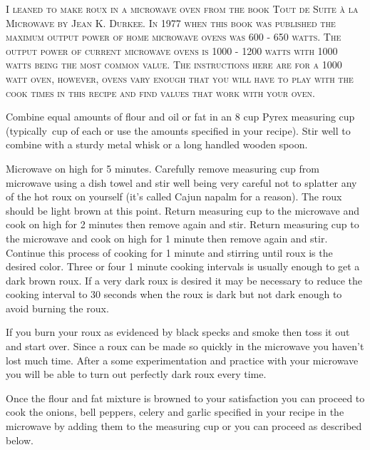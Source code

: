 \documentclass[letterpaper]{recipePMG}
\newcommand{\twothirds}{\nicefrac{2}{3} \,}
\begin{document}
\newpage

\label{BrownRoux}


\textsc{I leaned to make roux in a microwave oven from the book Tout de Suite \`{a} la Microwave by Jean K. Durkee. In 1977 when this book was published the maximum output power of home microwave ovens was 600 - 650 watts. The output power of current microwave ovens is 1000 - 1200 watts with 1000 watts being the most common value. The instructions here are for a 1000 watt oven, however, ovens vary enough that you will have to play with the cook times in this recipe and find values that work with your oven.}

Combine equal amounts  of flour and oil or fat in an 8 cup Pyrex measuring cup (typically \twothirds cup of each or use the amounts specified in your recipe). Stir well to combine with a sturdy metal whisk or a long handled wooden spoon.

Microwave on high for 5 minutes.  Carefully remove measuring cup from microwave using a dish towel and stir well being very careful not to splatter any of the hot roux on yourself (it's called Cajun napalm for a reason). The roux should be light brown at this point. Return measuring cup to the microwave and cook on high for 2 minutes then remove again and stir. Return measuring cup to the microwave and cook on high for 1 minute then remove again and stir. Continue this process of cooking for 1 minute and stirring until roux is the desired color. Three or four 1 minute cooking intervals is usually enough to get a dark brown roux. If a very dark roux is desired it may be necessary to reduce the cooking interval to 30 seconds when the roux is dark but not dark enough to avoid burning the roux. 

If you burn your roux as evidenced by black specks and smoke then toss it out and start over.  Since a roux can be made so quickly in the microwave you haven't lost much time.  After a some experimentation and practice with your microwave you will be able to turn out perfectly dark roux every time.

Once the flour and fat mixture is browned to your satisfaction you can proceed to cook the onions, bell peppers, celery and garlic specified in your recipe in the microwave by adding them to the measuring cup or you can proceed as described below.
\end{document}
